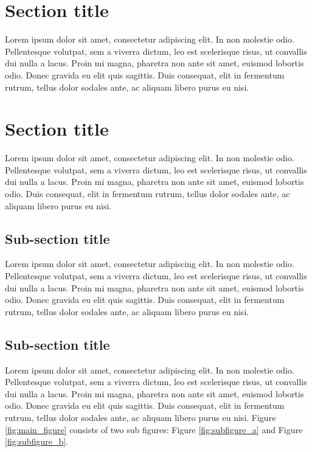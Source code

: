 \section{Section title}
Lorem ipsum dolor sit amet, consectetur adipiscing elit. In non molestie odio. Pellentesque volutpat, sem a viverra dictum, leo est scelerisque risus, ut convallis dui nulla a lacus. Proin mi magna, pharetra non ante sit amet, euismod lobortis odio. Donec gravida eu elit quis sagittis. Duis consequat, elit in fermentum rutrum, tellus dolor sodales ante, ac aliquam libero purus eu nisi. 

\section{Section title}
Lorem ipsum dolor sit amet, consectetur adipiscing elit. In non molestie odio. Pellentesque volutpat, sem a viverra dictum, leo est scelerisque risus, ut convallis dui nulla a lacus. Proin mi magna, pharetra non ante sit amet, euismod lobortis odio. Duis consequat, elit in fermentum rutrum, tellus dolor sodales ante, ac aliquam libero purus eu nisi. 

\subsection{Sub-section title}
Lorem ipsum dolor sit amet, consectetur adipiscing elit. In non molestie odio. Pellentesque volutpat, sem a viverra dictum, leo est scelerisque risus, ut convallis dui nulla a lacus. Proin mi magna, pharetra non ante sit amet, euismod lobortis odio.  Donec gravida eu elit quis sagittis. Duis consequat, elit in fermentum rutrum, tellus dolor sodales ante, ac aliquam libero purus eu nisi. 

\subsection{Sub-section title}
Lorem ipsum dolor sit amet, consectetur adipiscing elit. In non molestie odio. Pellentesque volutpat, sem a viverra dictum, leo est scelerisque risus, ut convallis dui nulla a lacus. Proin mi magna, pharetra non ante sit amet, euismod lobortis odio. Donec gravida eu elit quis sagittis. Duis consequat, elit in fermentum rutrum, tellus dolor sodales ante, ac aliquam libero purus eu nisi.  Figure \ref{fig:main_figure} consists of two sub figures: Figure \ref{fig:subfigure_a} and Figure \ref{fig:subfigure_b}.     

